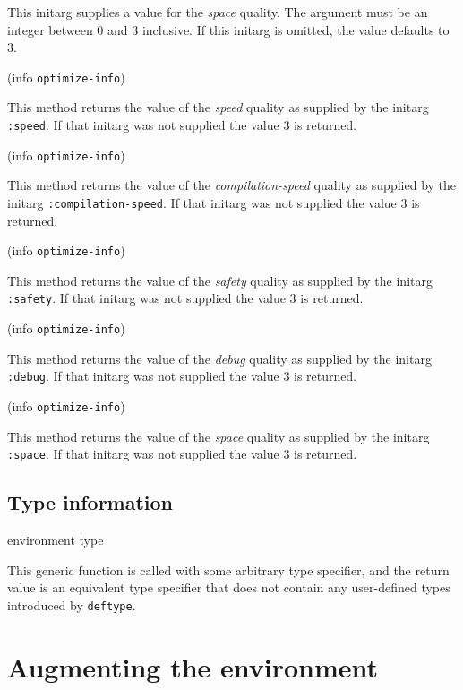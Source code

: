 
This initarg supplies a value for the \emph{space} quality.  The
argument must be an integer between $0$ and $3$ inclusive.  If this
initarg is omitted, the value defaults to $3$.

 {(info {\tt optimize-info})}

This method returns the value of the \emph{speed} quality as supplied
by the initarg \texttt{:speed}.  If that initarg was not supplied the
value $3$ is returned. 

 {(info {\tt optimize-info})}

This method returns the value of the \emph{compilation-speed} quality
as supplied by the initarg \texttt{:compilation-speed}.  If that
initarg was not supplied the value $3$ is returned.

 {(info {\tt optimize-info})}

This method returns the value of the \emph{safety} quality as supplied
by the initarg \texttt{:safety}.  If that initarg was not supplied the
value $3$ is returned. 

 {(info {\tt optimize-info})}

This method returns the value of the \emph{debug} quality as supplied
by the initarg \texttt{:debug}.  If that initarg was not supplied the
value $3$ is returned. 

 {(info {\tt optimize-info})}

This method returns the value of the \emph{space} quality as supplied
by the initarg \texttt{:space}.  If that initarg was not supplied the
value $3$ is returned. 

\subsection{Type information}

 {environment type}

This generic function is called with some arbitrary type specifier,
and the return value is an equivalent type specifier that does not
contain any user-defined types introduced by \texttt{deftype}. 

\section{Augmenting the environment}
\label{sec-environment-augmenting}

